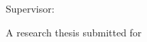 \begin{titlepage}
\centering
{}
\vspace*{10mm}
{\large\thesisuniversity\par}
\vspace{3mm}
{\normalsize\thesisschool\par}
\vspace{32mm}
{\fontsize{32}{38}\selectfont\bfseries\thesisshorttitle\par}
\vspace{8mm}
{\fontsize{18}{24}\selectfont\thesissubtitle\par}
\vspace{24mm}
{\Large\thesisauthor\par}
\ifx\thesisstudentnumber\empty\else
  \vspace{3mm}{\thesisstudentnumber\par}
\fi
\vspace{8mm}
{\normalsize Supervisor: \thesissupervisor\par}
\vfill
{A research thesis submitted for\par}
\vspace{3mm}
{\thesiscourse\par}
\vspace{12mm}
{\thesisdate\par}
\vspace*{6mm}
\end{titlepage}

